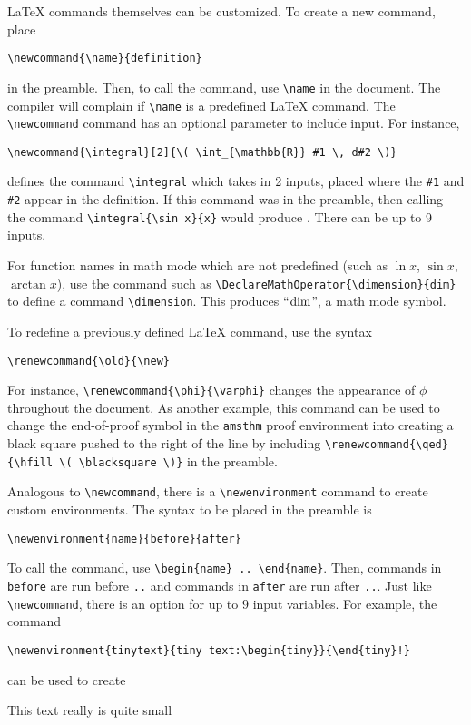 \documentclass[11pt]{article}
\begin{document}
\LaTeX{} commands themselves can be customized.  To create a new command, place
\begin{verbatim}
\newcommand{\name}{definition}
\end{verbatim}
in the preamble.  Then, to call the command, use \verb~\name~ in the document.  The 
compiler will complain if \verb~\name~ is a predefined \LaTeX{} command.  
The \verb~\newcommand~ command has an optional parameter to include input.  For 
instance,
\begin{verbatim}
\newcommand{\integral}[2]{\( \int_{\mathbb{R}} #1 \, d#2 \)}
\end{verbatim}
defines the command \verb~\integral~ which takes in 2 inputs, placed where the 
\verb~#1~ and \verb~#2~ appear in the definition.  If this command was in the preamble,
then calling the command \verb~\integral{\sin x}{x}~ would 
produce .  There can be up to 9 inputs.

For function names in math mode which are not predefined (such 
as $\ln x$, $\sin x$, $\arctan x$), use the command such as  
\verb~\DeclareMathOperator{\dimension}{dim}~ 
to define a command \verb~\dimension~.  This produces ``$\dimension$'', a math mode 
symbol.

To redefine a previously defined \LaTeX{} command, use the syntax
\begin{verbatim}
\renewcommand{\old}{\new}
\end{verbatim}
For instance, \verb~\renewcommand{\phi}{\varphi}~ changes the appearance of $\phi$ 
throughout the document.  As another example, this command can be used to change the 
end-of-proof symbol in the \verb~amsthm~ proof environment into creating a black 
square pushed to the right of the line by including
\verb~\renewcommand{\qed}{\hfill \( \blacksquare \)}~
in the preamble.

Analogous to \verb~\newcommand~, there is a \verb~\newenvironment~ command to create
custom environments.  The syntax to be placed in the preamble is 
\begin{verbatim}
\newenvironment{name}{before}{after}
\end{verbatim}
To call the command, use \verb~\begin{name} .. \end{name}~.  Then, commands in 
\verb~before~ are run before \verb~..~ and commands in \verb~after~ are run after
\verb~..~.  Just like \verb~\newcommand~, there is an option for up to $9$ input 
variables.  For example, the command
\begin{verbatim}
\newenvironment{tinytext}{tiny text:\begin{tiny}}{\end{tiny}!}
\end{verbatim}
can be used to create \begin{tinytext}This text really is quite small\end{tinytext}
\end{document}
